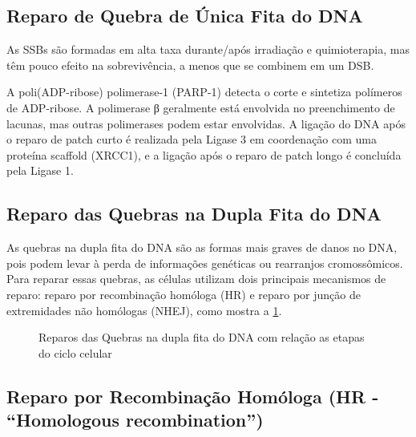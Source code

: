 \documentclass[11pt,a4paper]{article}
\begin{document}
\subsection{Reparo de Quebra de Única Fita do DNA}

	As SSBs são formadas em alta taxa durante/após irradiação e quimioterapia, mas têm pouco efeito na sobrevivência, a menos que se combinem em um DSB. 

	A poli(ADP-ribose) polimerase-1 (PARP-1) detecta o corte e sintetiza polímeros de ADP-ribose. A polimerase β geralmente está envolvida no preenchimento de lacunas, mas outras polimerases podem estar envolvidas. A ligação do DNA após o reparo de patch curto é realizada pela Ligase 3 em coordenação com uma proteína scaffold (XRCC1), e a ligação após o reparo de patch longo é concluída pela Ligase 1.


\subsection{Reparo das Quebras na Dupla Fita do DNA}

	As quebras na dupla fita do DNA são as formas mais graves de danos no DNA, pois podem levar à perda de informações genéticas ou rearranjos cromossômicos. Para reparar essas quebras, as células utilizam dois principais mecanismos de reparo: reparo por recombinação homóloga (HR) e reparo por junção de extremidades não homólogas (NHEJ), como mostra a \ref{fig:reparoQuebraDupla}. 

	\begin{figure}
		\centering
		\caption{Reparos das Quebras na dupla fita do DNA com relação as etapas do ciclo celular}
		\label{fig:reparoQuebraDupla}
	\end{figure}

\subsection*{Reparo por Recombinação Homóloga (HR - ``Homologous recombination'')}
\end{document}
